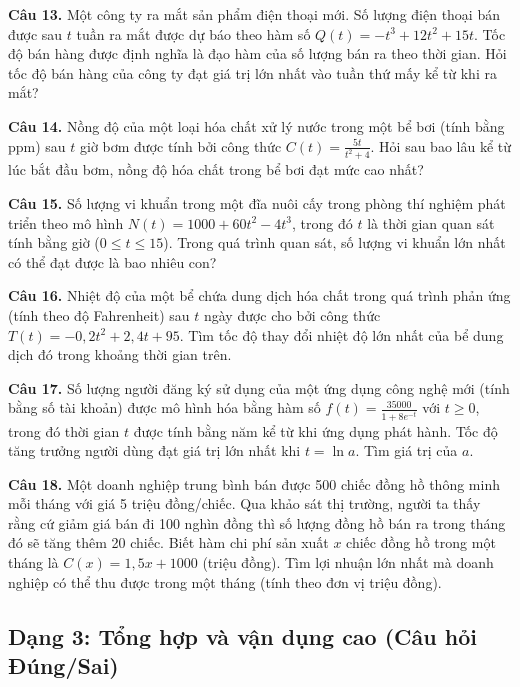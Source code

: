 \documentclass[12pt]{article}
\begin{document}
	\vspace{0.5cm}
	\noindent \textbf{Câu 13.} Một công ty ra mắt sản phẩm điện thoại mới. Số lượng điện thoại bán được sau $t$ tuần ra mắt được dự báo theo hàm số $Q(t) = -t^3 + 12t^2 + 15t$. Tốc độ bán hàng được định nghĩa là đạo hàm của số lượng bán ra theo thời gian. Hỏi tốc độ bán hàng của công ty đạt giá trị lớn nhất vào tuần thứ mấy kể từ khi ra mắt?
	
	\vspace{0.5cm}
	\noindent \textbf{Câu 14.} Nồng độ của một loại hóa chất xử lý nước trong một bể bơi (tính bằng ppm) sau $t$ giờ bơm được tính bởi công thức $C(t) = \frac{5t}{t^2 + 4}$. Hỏi sau bao lâu kể từ lúc bắt đầu bơm, nồng độ hóa chất trong bể bơi đạt mức cao nhất?
	
	\vspace{0.5cm}
	\noindent \textbf{Câu 15.} Số lượng vi khuẩn trong một đĩa nuôi cấy trong phòng thí nghiệm phát triển theo mô hình $N(t) = 1000 + 60t^2 - 4t^3$, trong đó $t$ là thời gian quan sát tính bằng giờ ($0 \le t \le 15$). Trong quá trình quan sát, số lượng vi khuẩn lớn nhất có thể đạt được là bao nhiêu con?
	
	\vspace{0.5cm}
	\noindent \textbf{Câu 16.} Nhiệt độ của một bể chứa dung dịch hóa chất trong quá trình phản ứng (tính theo độ Fahrenheit) sau $t$ ngày được cho bởi công thức $T(t) = -0,2t^2 + 2,4t + 95$. Tìm tốc độ thay đổi nhiệt độ lớn nhất của bể dung dịch đó trong khoảng thời gian trên.
	
	\vspace{0.5cm}
	\noindent \textbf{Câu 17.} Số lượng người đăng ký sử dụng của một ứng dụng công nghệ mới (tính bằng số tài khoản) được mô hình hóa bằng hàm số $f(t) = \frac{35000}{1 + 8e^{-t}}$ với $t \ge 0$, trong đó thời gian $t$ được tính bằng năm kể từ khi ứng dụng phát hành. Tốc độ tăng trưởng người dùng đạt giá trị lớn nhất khi $t = \ln a$. Tìm giá trị của $a$.
	
	\vspace{0.5cm}
	\noindent \textbf{Câu 18.} Một doanh nghiệp trung bình bán được 500 chiếc đồng hồ thông minh mỗi tháng với giá 5 triệu đồng/chiếc. Qua khảo sát thị trường, người ta thấy rằng cứ giảm giá bán đi 100 nghìn đồng thì số lượng đồng hồ bán ra trong tháng đó sẽ tăng thêm 20 chiếc. Biết hàm chi phí sản xuất $x$ chiếc đồng hồ trong một tháng là $C(x) = 1,5x + 1000$ (triệu đồng). Tìm lợi nhuận lớn nhất mà doanh nghiệp có thể thu được trong một tháng (tính theo đơn vị triệu đồng).

	\subsection{Dạng 3: Tổng hợp và vận dụng cao (Câu hỏi Đúng/Sai)}
	
\end{document}
